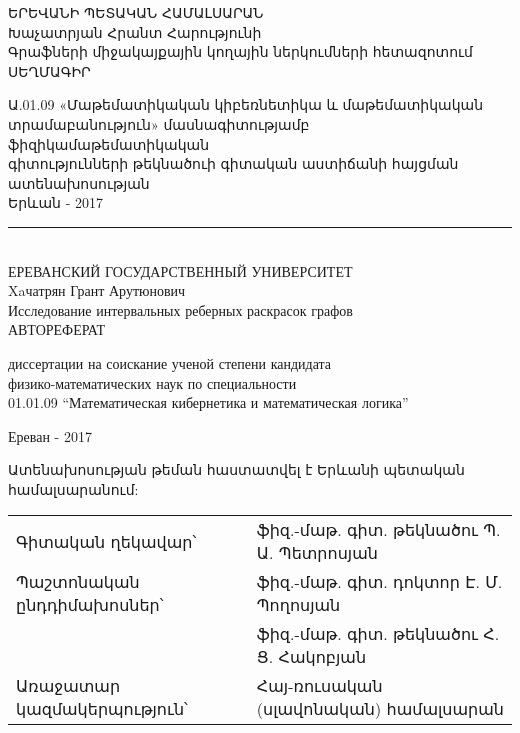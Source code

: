 \thispagestyle{empty}
\begin{center}

\textsc{ԵՐԵՎԱՆԻ ՊԵՏԱԿԱՆ ՀԱՄԱԼՍԱՐԱՆ}\\[1cm]

{Խաչատրյան Հրանտ Հարությունի\\[0.5cm]}
{Գրաֆների միջակայքային կողային ներկումների հետազոտում\\[1.2cm]}
{ՍԵՂՄԱԳԻՐ \\[1.2cm]}

Ա.01.09 «Մաթեմատիկական կիբեռնետիկա և  
մաթեմատիկական \\ տրամաբանություն» մասնագիտությամբ ֆիզիկամաթեմատիկական \\ գիտությունների թեկնածուի գիտական աստիճանի հայցման ատենախոսության \\[1cm]

Երևան - 2017\\[0.6cm]
\rule{\textwidth}{1pt}\\[0.8cm]

\textsc{ЕРЕВАНСКИЙ ГОСУДАРСТВЕННЫЙ УНИВЕРСИТЕТ}\\[1cm]

{Xaчатрян Грант Арутюнович\\[0.5cm]}
{Исследование интервальных реберных раскрасок графов\\[1.2cm]}
{АВТОРЕФЕРАТ \\[1.2cm]}

диссертации на соискание ученой степени кандидата \\
физико-математических наук по специальности\\ 01.01.09 “Математическая кибернетика и математическая логика” \\[1cm]
\vfill

Ереван - 2017\\[0.2cm]


\end{center}

Ատենախոսության թեման հաստատվել է Երևանի պետական համալսարանում:\\[0.3cm]

\begin{tabularx}{\textwidth}{Xl}
Գիտական ղեկավար՝     & ֆիզ.-մաթ. գիտ. թեկնածու Պ. Ա. Պետրոսյան \\
Պաշտոնական ընդդիմախոսներ՝ & ֆիզ.-մաթ. գիտ. դոկտոր Է. Մ. Պողոսյան \\
 & ֆիզ.-մաթ. գիտ. թեկնածու Հ. Ց. Հակոբյան \\
Առաջատար կազմակերպություն՝  & Հայ-ռուսական (սլավոնական) համալսարան
\end{tabularx}\\[0.5cm]
     
